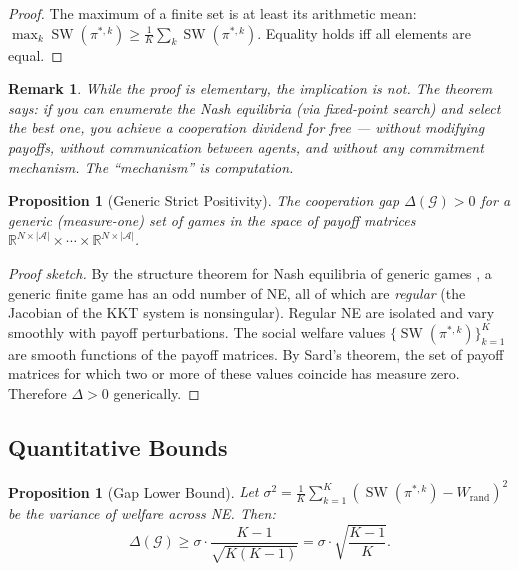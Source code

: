 \documentclass[11pt,a4paper]{article}
\newtheorem{proposition}[theorem]{Proposition}
\newtheorem{remark}[theorem]{Remark}
\DeclareMathOperator{\SW}{SW}
\newcommand{\R}{\mathbb{R}}
\begin{document}
\begin{proof}
The maximum of a finite set is at least its arithmetic mean:
$\max_{k} \SW(\pi^{*,k}) \geq \frac{1}{K}\sum_k \SW(\pi^{*,k})$.
Equality holds iff all elements are equal.
\end{proof}

\begin{remark}
While the proof is elementary, the \emph{implication} is not. The
theorem says: if you can enumerate the Nash equilibria (via
fixed-point search) and select the best one, you achieve a
cooperation dividend for free --- without modifying payoffs,
without communication between agents, and without any commitment
mechanism. The ``mechanism'' is computation.
\end{remark}

\begin{proposition}[Generic Strict Positivity]\label{prop:generic}
The cooperation gap $\Delta(\mathcal{G}) > 0$ for a generic
(measure-one) set of games in the space of payoff matrices
$\R^{N \times |\mathcal{A}|} \times \cdots \times \R^{N \times |\mathcal{A}|}$.
\end{proposition}

\begin{proof}[Proof sketch]
By the structure theorem for Nash equilibria of generic games
\cite{harsanyi1973}, a generic finite game has an odd number of NE,
all of which are \emph{regular} (the Jacobian of the KKT system is
nonsingular). Regular NE are isolated and vary smoothly with payoff
perturbations. The social welfare values $\{\SW(\pi^{*,k})\}_{k=1}^K$
are smooth functions of the payoff matrices. By Sard's theorem, the
set of payoff matrices for which two or more of these values coincide
has measure zero. Therefore $\Delta > 0$ generically.
\end{proof}

\subsection{Quantitative Bounds}

\begin{proposition}[Gap Lower Bound]\label{prop:lower-bound}
Let $\sigma^2 = \frac{1}{K}\sum_{k=1}^K (\SW(\pi^{*,k}) - W_{\text{rand}})^2$
be the variance of welfare across NE. Then:
\begin{equation}
    \Delta(\mathcal{G}) \geq \sigma \cdot \frac{K-1}{\sqrt{K(K-1)}}
    = \sigma \cdot \sqrt{\frac{K-1}{K}}.
\end{equation}
\end{proposition}
\end{document}
